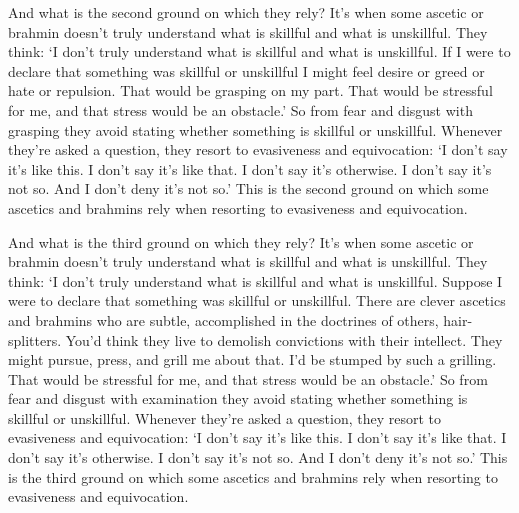 \documentclass[12pt,openany]{book}%
\begin{document}
And what is the second ground on which they rely? It’s when some ascetic or brahmin doesn’t truly understand what is skillful and what is unskillful. They think: ‘I don’t truly understand what is skillful and what is unskillful. If I were to declare that something was skillful or unskillful I might feel desire or greed or hate or repulsion. That would be grasping on my part. That would be stressful for me, and that stress would be an obstacle.’ So from fear and disgust with grasping they avoid stating whether something is skillful or unskillful. Whenever they’re asked a question, they resort to evasiveness and equivocation: ‘I don’t say it’s like this. I don’t say it’s like that. I don’t say it’s otherwise. I don’t say it’s not so. And I don’t deny it’s not so.’ This is the second ground on which some ascetics and brahmins rely when resorting to evasiveness and equivocation. 

And what is the third ground on which they rely? It’s when some ascetic or brahmin doesn’t truly understand what is skillful and what is unskillful. They think: ‘I don’t truly understand what is skillful and what is unskillful. Suppose I were to declare that something was skillful or unskillful. There are clever ascetics and brahmins who are subtle, accomplished in the doctrines of others, hair-splitters. You’d think they live to demolish convictions with their intellect. They might pursue, press, and grill me about that. I’d be stumped by such a grilling. That would be stressful for me, and that stress would be an obstacle.’ So from fear and disgust with examination they avoid stating whether something is skillful or unskillful. Whenever they’re asked a question, they resort to evasiveness and equivocation: ‘I don’t say it’s like this. I don’t say it’s like that. I don’t say it’s otherwise. I don’t say it’s not so. And I don’t deny it’s not so.’ This is the third ground on which some ascetics and brahmins rely when resorting to evasiveness and equivocation. 
\end{document}
